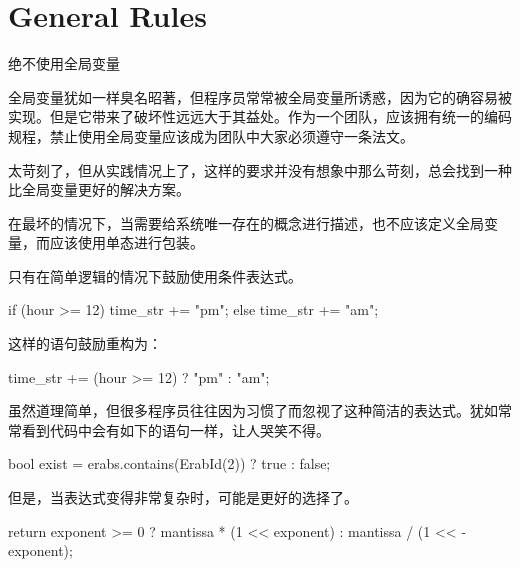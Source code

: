 \section{General Rules}

\begin{content}

\begin{regulation}
绝不使用全局变量
\end{regulation}

全局变量犹如一样臭名昭著，但程序员常常被全局变量所诱惑，因为它的确容易被实现。但是它带来了破坏性远远大于其益处。作为一个团队，应该拥有统一的编码规程，禁止使用全局变量应该成为团队中大家必须遵守一条法文。

太苛刻了，但从实践情况上了，这样的要求并没有想象中那么苛刻，总会找到一种比全局变量更好的解决方案。

在最坏的情况下，当需要给系统唯一存在的概念进行描述，也不应该定义全局变量，而应该使用单态进行包装。

\begin{regulation}
只有在简单逻辑的情况下鼓励使用条件表达式。
\end{regulation}

\begin{leftbar}
\begin{c++}
if (hour >= 12) 
{
    time_str += "pm";
} 
else 
{
    time_str += "am";
}
\end{c++}
\end{leftbar}

这样的语句鼓励重构为：
\begin{leftbar}
\begin{c++}
time_str += (hour >= 12) ? "pm" : "am";
\end{c++}
\end{leftbar}

虽然道理简单，但很多程序员往往因为习惯了而忽视了这种简洁的表达式。犹如常常看到代码中会有如下的语句一样，让人哭笑不得。

\begin{leftbar}
\begin{c++}
bool exist = erabs.contains(ErabId(2)) ? true : false;
\end{c++}
\end{leftbar}

但是，当表达式变得非常复杂时，可能是更好的选择了。

\begin{leftbar}
\begin{c++}
return exponent >= 0 ? mantissa * (1 << exponent) : mantissa / (1 << -exponent);
\end{c++}
\end{leftbar}


\end{content}
